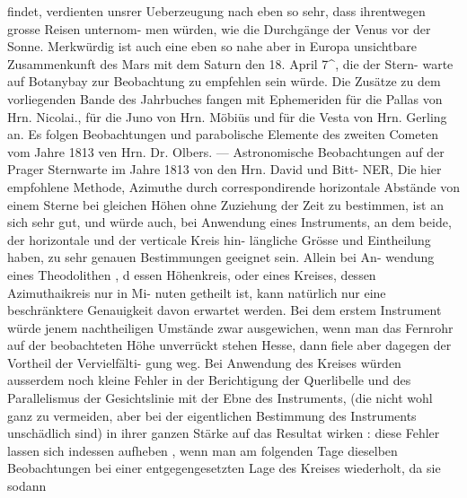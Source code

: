 \documentclass[12pt,a4paper]{article}
\begin{document}
findet, verdienten unsrer Ueberzeugung nach eben so sehr, dass ihrentwegen grosse Reisen unternom-\newline
men würden, wie die Durchgänge der Venus vor der Sonne. Merkwürdig ist auch eine eben so nahe\newline
aber in Europa unsichtbare Zusammenkunft des Mars mit dem Saturn den 18. April 7\^{}, die der Stern-\newline
warte auf Botanybay zur Beobachtung zu empfehlen sein würde.\newline
Die Zusätze zu dem vorliegenden Bande des Jahrbuches fangen mit Ephemeriden für die Pallas\newline
von Hrn. Nicolai., für die Juno von Hrn. Möbiüs und für die Vesta von Hrn. Gerling an. Es folgen\newline
Beobachtungen und parabolische Elemente des zweiten Cometen vom Jahre 1813 ven Hrn. Dr. Olbers. ---\newline
Astronomische Beobachtungen auf der Prager Sternwarte im Jahre 1813 von den Hrn. David und Bitt-\newline
NER, Die hier empfohlene Methode, Azimuthe durch correspondirende horizontale Abstände von einem\newline
Sterne bei gleichen Höhen ohne Zuziehung der Zeit zu bestimmen, ist an sich sehr gut, und würde\newline
auch, bei Anwendung eines Instruments, an dem beide, der horizontale und der verticale Kreis hin-\newline
längliche Grösse und Eintheilung haben, zu sehr genauen Bestimmungen geeignet sein. Allein bei An-\newline
wendung eines Theodolithen , d essen Höhenkreis, oder eines Kreises, dessen Azimuthaikreis nur in Mi-\newline
nuten getheilt ist, kann natürlich nur eine beschränktere Genauigkeit davon erwartet werden. Bei dem\newline
erstem Instrument würde jenem nachtheiligen Umstände zwar ausgewichen, wenn man das Fernrohr auf\newline
der beobachteten Höhe unverrückt stehen Hesse, dann fiele aber dagegen der Vortheil der Vervielfälti-\newline
gung weg. Bei Anwendung des Kreises würden ausserdem noch kleine Fehler in der Berichtigung der\newline
Querlibelle und des Parallelismus der Gesichtslinie mit der Ebne des Instruments, (die nicht wohl ganz\newline
zu vermeiden, aber bei der eigentlichen Bestimmung des Instruments unschädlich sind) in ihrer ganzen\newline
Stärke auf das Resultat wirken : diese Fehler lassen sich indessen aufheben , wenn man am folgenden\newline
Tage dieselben Beobachtungen bei einer entgegengesetzten Lage des Kreises wiederholt, da sie sodann\newline
\end{document}
